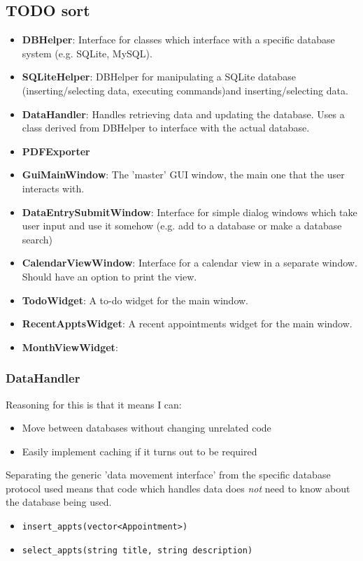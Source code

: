 \subsection{TODO sort}

\newcommand{\classitem}[1]{\item \textbf{#1}}

\begin{itemize}
    \classitem{DBHelper}: Interface for classes which interface with a specific
    database system (e.g. SQLite, MySQL).
    \classitem{SQLiteHelper}: DBHelper for manipulating a SQLite database
    (inserting/selecting data, executing commands)and inserting/selecting data.
    \classitem{DataHandler}: Handles retrieving data and updating the database.
    Uses a class derived from DBHelper to interface with the actual database.
    \classitem{PDFExporter}
\end{itemize}

\begin{itemize}
    \classitem{GuiMainWindow}: The 'master' GUI window, the main one that the
        user interacts with.
    \classitem{DataEntrySubmitWindow}: Interface for simple dialog windows
        which take user input and use it somehow (e.g. add to a database or make
        a database search)
    \classitem{CalendarViewWindow}: Interface for a calendar view in a separate
        window. Should have an option to print the view.
    \classitem{TodoWidget}: A to-do widget for the main window.
    \classitem{RecentApptsWidget}: A recent appointments widget for the main
    window.
    \classitem{MonthViewWidget}:
\end{itemize}


\subsubsection{DataHandler}

Reasoning for this is that it means I can:

\begin{itemize}
    \item Move between databases without changing unrelated code
    \item Easily implement caching if it turns out to be required
\end{itemize}

Separating the generic 'data movement interface' from the specific database
protocol used means that code which handles data does \textit{not} need to know
about the database being used.

\begin{itemize}
    \item \verb+insert_appts(vector<Appointment>)+
    \item \verb+select_appts(string title, string description)+
\end{itemize}
